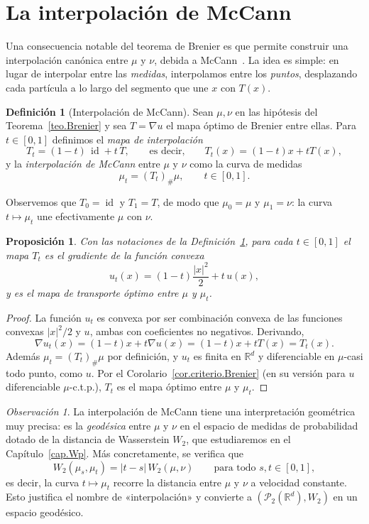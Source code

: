 \documentclass[12pt, a4paper]{amsbook}
\newcommand{\id}{\operatorname{id}}
\newcommand{\R}{{\mathbb R}}
\newtheorem{prop}[teo]{Proposición}
\theoremstyle{remark}
\newtheorem{obs}[teo]{Observación}
\theoremstyle{definition}
\newtheorem{defi}[teo]{Definición}
\numberwithin{section}{chapter}
\numberwithin{subsection}{section}
\numberwithin{equation}{section}
\numberwithin{figure}{chapter}
\begin{document}
\section{La interpolación de McCann}\label{sec.McCann}

Una consecuencia notable del teorema de Brenier es que permite construir una
interpolación canónica entre $\mu$ y $\nu$, debida a McCann~\cite{McCann1997}.
La idea es simple: en lugar de interpolar entre las \emph{medidas}, interpolamos
entre los \emph{puntos}, desplazando cada partícula a lo largo del segmento que
une $x$ con $T(x)$.

\begin{defi}[Interpolación de McCann]\label{def.McCann}
Sean $\mu,\nu$ en las hipótesis del Teorema~\ref{teo.Brenier} y sea $T=\nabla u$
el mapa óptimo de Brenier entre ellas. Para $t\in[0,1]$ definimos el
\emph{mapa de interpolación}
\[
T_t=(1-t)\,\id+t\,T,
\qquad\text{es decir,}\qquad
T_t(x)=(1-t)x+tT(x),
\]
y la \emph{interpolación de McCann} entre $\mu$ y $\nu$ como la curva de medidas
\[
\mu_t=(T_t)_\#\mu,
\qquad t\in[0,1].
\]
\end{defi}

Observemos que $T_0=\id$ y $T_1=T$, de modo que $\mu_0=\mu$ y $\mu_1=\nu$: la
curva $t\mapsto\mu_t$ une efectivamente $\mu$ con $\nu$.

\begin{prop}\label{prop.McCann}
Con las notaciones de la Definición~\ref{def.McCann}, para cada $t\in[0,1]$ el
mapa $T_t$ es el gradiente de la función convexa
\[
u_t(x)=(1-t)\frac{|x|^2}{2}+t\,u(x),
\]
y es el mapa de transporte óptimo entre $\mu$ y $\mu_t$.
\end{prop}

\begin{proof}
La función $u_t$ es convexa por ser combinación convexa de las funciones
convexas $|x|^2/2$ y $u$, ambas con coeficientes no negativos. Derivando,
\[
\nabla u_t(x)=(1-t)x+t\nabla u(x)=(1-t)x+tT(x)=T_t(x).
\]
Además $\mu_t=(T_t)_\#\mu$ por definición, y $u_t$ es finita en $\R^d$ y
diferenciable en $\mu$-casi todo punto, como $u$. Por el
Corolario~\ref{cor.criterio.Brenier} (en su versión para $u$ diferenciable
$\mu$-c.t.p.), $T_t$ es el mapa óptimo entre $\mu$ y $\mu_t$.
\end{proof}

\begin{obs}
La interpolación de McCann tiene una interpretación geométrica muy precisa: es
la \emph{geodésica} entre $\mu$ y $\nu$ en el espacio de medidas de probabilidad
dotado de la distancia de Wasserstein $W_2$, que estudiaremos en el
Capítulo~\ref{cap.Wp}. Más concretamente, se verifica que
\[
W_2(\mu_s,\mu_t)=|t-s|\,W_2(\mu,\nu)
\qquad
\text{para todo }s,t\in[0,1],
\]
es decir, la curva $t\mapsto\mu_t$ recorre la distancia entre $\mu$ y $\nu$ a
velocidad constante. Esto justifica el nombre de «interpolación» y convierte a
$(\mathcal P_2(\R^d),W_2)$ en un espacio geodésico.
\end{obs}
\end{document}
